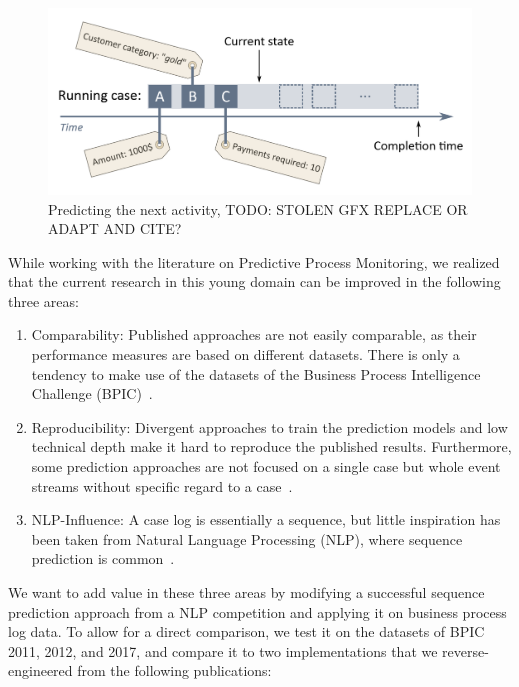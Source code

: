 \begin{figure}
    \centering
    \includegraphics[width=\textwidth]{gfx/next-activity.png}
    \caption{Predicting the next activity, TODO: STOLEN GFX REPLACE OR ADAPT AND CITE?}
    \label{fig:next-activity-prediction}
\end{figure}

While working with the literature on Predictive Process Monitoring, we realized that the current research in this young domain can be improved in the following three areas:

\begin{enumerate}
    \item Comparability: Published approaches are not easily comparable, as their performance measures are based on different datasets. There is only a tendency to make use of the datasets of the Business Process Intelligence Challenge (BPIC)~\cite{BPIC2011, BPIC2012, BPIC2017}.
    \item Reproducibility: Divergent approaches to train the prediction models and low technical depth make it hard to reproduce the published results. Furthermore, some prediction approaches are not focused on a single case but whole event streams without specific regard to a case~\cite{evermann2016, schoenig2018}.
    \item NLP-Influence: A case log is essentially a sequence, but little inspiration has been taken from Natural Language Processing (NLP), where sequence prediction is common~\cite{shibata2016bipartite}.
\end{enumerate}

We want to add value in these three areas by modifying a successful sequence prediction approach from a NLP competition and applying it on business process log data. To allow for a direct comparison, we test it on the datasets of BPIC 2011, 2012, and 2017, and compare it to two implementations that we reverse-engineered from the following publications:


